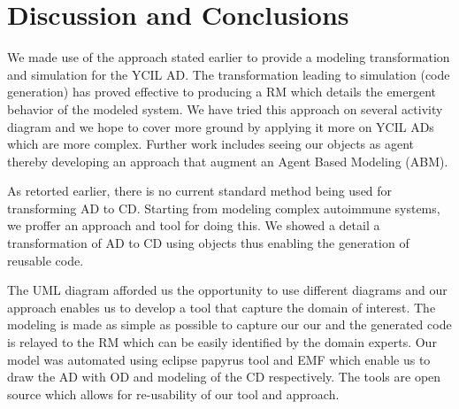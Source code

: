 \documentclass[10pt]{article}
\begin{document}
\section{Discussion and Conclusions}
We made use of the approach stated earlier to provide a modeling transformation and simulation for the YCIL AD. The transformation leading to simulation (code generation) has proved effective to producing a RM which details the emergent behavior of the modeled system. We have tried this approach on several activity diagram and we hope to cover more ground by applying it more on YCIL ADs which are more complex. Further work includes seeing our objects as agent thereby developing an approach that augment an Agent Based Modeling (ABM). 

As retorted earlier, there is no current standard method being used for transforming AD to CD. Starting from modeling complex autoimmune systems, we proffer an approach and tool for doing this. We showed a detail a transformation of AD to CD using objects thus enabling the generation of reusable code.

The UML diagram afforded us the opportunity to use different diagrams and our approach enables us to develop a tool that capture the domain of interest. The modeling is made as simple as possible to capture our our and the generated code is relayed to the RM which can be easily identified by the domain experts. Our model was automated using eclipse papyrus tool and EMF which enable us to draw the AD with OD and modeling of the CD respectively. The tools are open source which allows for re-usability of our tool and approach. 







  
\end{document}
